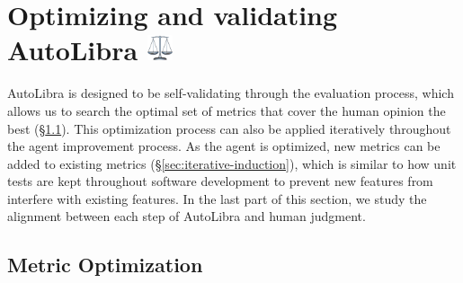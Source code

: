 \section{Optimizing and validating AutoLibra \protect
\includegraphics[height=1em]{figs/scale.png}}
AutoLibra is designed to be self-validating through the evaluation process,
which allows us to search the optimal set of metrics that cover the human
opinion the best (\S\ref{sec:metric-optimization}). This optimization process
can also be applied iteratively throughout the agent improvement process. As the
agent is optimized, new metrics can be added to existing metrics (\S\ref{sec:iterative-induction}),
which is similar to how unit tests are kept throughout software development to
prevent new features from interfere with existing features. In the last part of this
section, we study the alignment between each step of AutoLibra and human
judgment.

\subsection{Metric Optimization}
\label{sec:metric-optimization}

